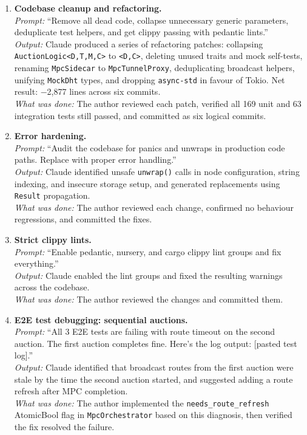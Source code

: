 \begin{enumerate}
  \item \textbf{Codebase cleanup and refactoring.}\\
    \textit{Prompt:} ``Remove all dead code, collapse unnecessary
    generic parameters, deduplicate test helpers, and get clippy passing
    with pedantic lints.''\\
    \textit{Output:} Claude produced a series of refactoring patches:
    collapsing \texttt{AuctionLogic<D,T,M,C>} to \texttt{<D,C>},
    deleting unused traits and mock self-tests, renaming
    \texttt{MpcSidecar} to \texttt{MpcTunnelProxy}, deduplicating
    broadcast helpers, unifying \texttt{MockDht} types, and dropping
    \texttt{async-std} in favour of Tokio.  Net result: $-$2,877 lines
    across six commits.\\
    \textit{What was done:} The author reviewed each patch, verified
    all 169 unit and 63 integration tests still passed, and committed
    as six logical commits.

  \item \textbf{Error hardening.}\\
    \textit{Prompt:} ``Audit the codebase for panics and unwraps in
    production code paths.  Replace with proper error handling.''\\
    \textit{Output:} Claude identified unsafe \texttt{unwrap()} calls
    in node configuration, string indexing, and insecure storage setup,
    and generated replacements using \texttt{Result} propagation.\\
    \textit{What was done:} The author reviewed each change, confirmed
    no behaviour regressions, and committed the fixes.

  \item \textbf{Strict clippy lints.}\\
    \textit{Prompt:} ``Enable pedantic, nursery, and cargo clippy lint
    groups and fix everything.''\\
    \textit{Output:} Claude enabled the lint groups and fixed the
    resulting warnings across the codebase.\\
    \textit{What was done:} The author reviewed the changes and
    committed them.

  \item \textbf{E2E test debugging: sequential auctions.}\\
    \textit{Prompt:} ``All 3 E2E tests are failing with route timeout on
    the second auction.  The first auction completes fine.  Here's the log
    output: [pasted test log].''\\
    \textit{Output:} Claude identified that broadcast routes from the
    first auction were stale by the time the second auction started, and
    suggested adding a route refresh after MPC completion.\\
    \textit{What was done:} The author implemented the
    \texttt{needs\_route\_refresh} AtomicBool flag in
    \texttt{MpcOrchestrator} based on this diagnosis, then verified the
    fix resolved the failure.


\end{enumerate}
